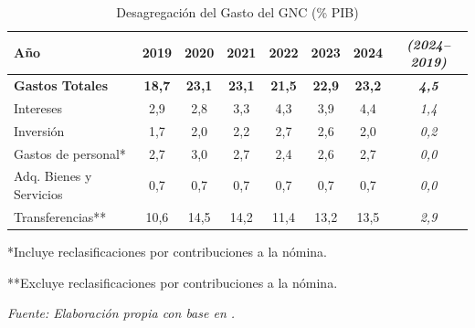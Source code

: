 
\begin{table}[h!]
\centering
\caption{Desagregación del Gasto del GNC (\% PIB)}
\label{tab:GastoDesagregado}
\begin{tabular}{lccccccc}
\hline
\textbf{Año}                      & \textbf{2019} & \textbf{2020} & \textbf{2021} & \textbf{2022} & \textbf{2023} & \textbf{2024} & \textit{\textbf{(2024–2019)}} \\ \hline
\textbf{Gastos Totales}           & \textbf{18,7} & \textbf{23,1} & \textbf{23,1} & \textbf{21,5} & \textbf{22,9} & \textbf{23,2} & \textbf{\textit{4,5}} \\
Intereses                         & 2,9           & 2,8           & 3,3           & 4,3           & 3,9           & 4,4           & \textit{1,4} \\
Inversión                         & 1,7           & 2,0           & 2,2           & 2,7           & 2,6           & 2,0           & \textit{0,2} \\
Gastos de personal*               & 2,7           & 3,0           & 2,7           & 2,4           & 2,6           & 2,7           & \textit{0,0} \\
Adq. Bienes y Servicios           & 0,7           & 0,7           & 0,7           & 0,7           & 0,7           & 0,7           & \textit{0,0} \\
Transferencias**                  & 10,6          & 14,5          & 14,2          & 11,4          & 13,2          & 13,5          & \textit{2,9} \\ \hline
\end{tabular}
\par \footnotesize{*Incluye reclasificaciones por contribuciones a la nómina.}
\par \footnotesize{**Excluye reclasificaciones por contribuciones a la nómina.}
\vspace{0.1cm}
\par \footnotesize{\textit{Fuente: Elaboración propia con base en \textcite{minhacienda_balance_2025}.}}
\end{table}
